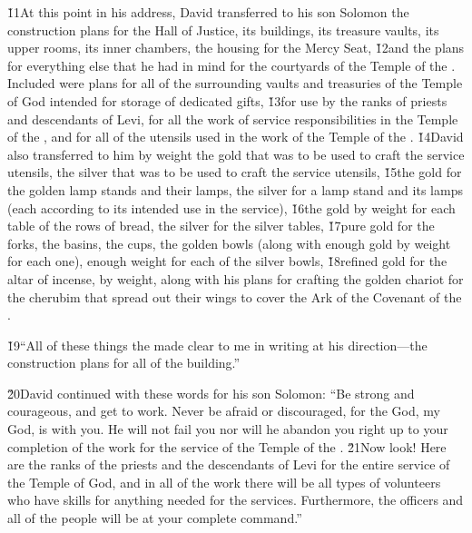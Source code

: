 \v{11}At this point in his address, David transferred to his son Solomon the construction plans for the Hall of Justice, its buildings, its treasure vaults, its upper rooms, its inner chambers, the housing for the Mercy Seat, \v{12}and the plans for everything else that he had in mind for the courtyards of the Temple of the . Included were plans for all of the surrounding vaults and treasuries of the Temple of God intended for storage of dedicated gifts, \v{13}for use by the ranks of priests and descendants of Levi, for all the work of service responsibilities in the Temple of the , and for all of the utensils used in the work of the Temple of the . \v{14}David also transferred to him by weight the gold that was to be used to craft the service utensils, the silver that was to be used to craft the service utensils, \v{15}the gold for the golden lamp stands and their lamps, the silver for a lamp stand and its lamps (each according to its intended use in the service), \v{16}the gold by weight for each table of the rows of bread, the silver for the silver tables, \v{17}pure gold for the forks, the basins, the cups, the golden bowls (along with enough gold by weight for each one), enough weight for each of the silver bowls, \v{18}refined gold for the altar of incense, by weight, along with his plans for crafting the golden chariot for the cherubim that spread out their wings to cover the Ark of the Covenant of the .

\v{19}``All of these things the  made clear to me in writing at his direction---the construction plans for all of the building.''

\v{20}David continued with these words for his son Solomon: ``Be strong and courageous, and get to work. Never be afraid or discouraged, for the  God, my God, is with you. He will not fail you nor will he abandon you right up to your completion of the work for the service of the Temple of the . \v{21}Now look! Here are the ranks of the priests and the descendants of Levi for the entire service of the Temple of God, and in all of the work there will be all types of volunteers who have skills for anything needed for the services. Furthermore, the officers and all of the people will be at your complete command.''


